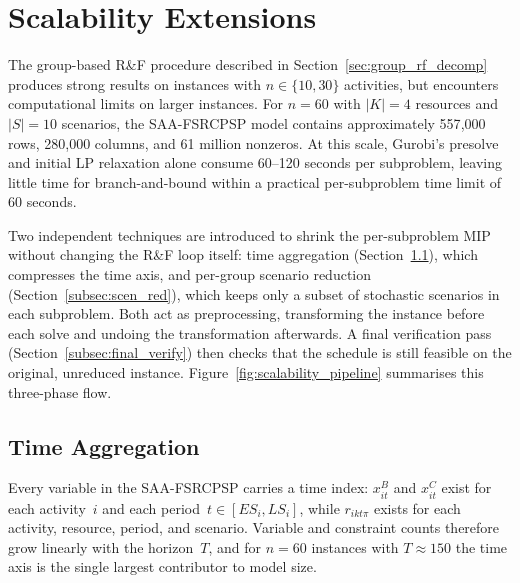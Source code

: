 \section{Scalability Extensions}
\label{sec:scalability}
The group-based R\&F procedure described in
Section~\ref{sec:group_rf_decomp} produces strong results on
instances with $n \in \{10, 30\}$ activities, but encounters
computational limits on larger instances. For $n = 60$ with
$|K| = 4$ resources and $|S| = 10$ scenarios, the SAA-FSRCPSP
model contains approximately 557{,}000 rows, 280{,}000 columns,
and 61 million nonzeros. At this scale, Gurobi's presolve and
initial LP relaxation alone consume 60--120 seconds per
subproblem, leaving little time for branch-and-bound within a
practical per-subproblem time limit of 60 seconds.

Two independent techniques are introduced to shrink the
per-subproblem MIP without changing the R\&F loop itself:
time aggregation (Section~\ref{subsec:time_agg}), which
compresses the time axis, and per-group scenario reduction
(Section~\ref{subsec:scen_red}), which keeps only a subset
of stochastic scenarios in each subproblem. Both act as
preprocessing, transforming the instance before each solve
and undoing the transformation afterwards. A final verification
pass (Section~\ref{subsec:final_verify}) then checks that the
schedule is still feasible on the original, unreduced instance.
Figure~\ref{fig:scalability_pipeline} summarises this
three-phase flow.



\subsection{Time Aggregation}
\label{subsec:time_agg}

Every variable in the SAA-FSRCPSP carries a time index:
$x^B_{it}$ and $x^C_{it}$ exist for each activity~$i$ and each
period~$t \in [ES_i, LS_i]$, while $r_{ikt\pi}$ exists for each
activity, resource, period, and scenario. Variable and constraint
counts therefore grow linearly with the horizon~$T$, and for
$n = 60$ instances with $T \approx 150$ the time axis is the
single largest contributor to model size.

